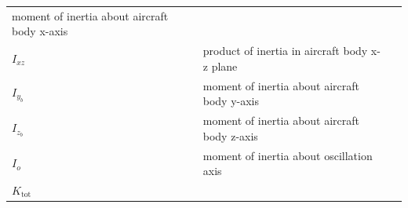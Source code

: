 \documentclass[
]{book}
\begin{document}
\begin{longtable}[]{@{}lll@{}}
\begin{minipage}[t]{0.68\columnwidth}
moment of inertia about aircraft body x-axis\strut
\end{minipage} & \begin{minipage}[t]{0.10\columnwidth}\raggedright
\strut
\end{minipage}\tabularnewline
\begin{minipage}[t]{0.14\columnwidth}\raggedright
\(I_{xz}\)\strut
\end{minipage} & \begin{minipage}[t]{0.68\columnwidth}\raggedright
product of inertia in aircraft body x-z plane\strut
\end{minipage} & \begin{minipage}[t]{0.10\columnwidth}\raggedright
\strut
\end{minipage}\tabularnewline
\begin{minipage}[t]{0.14\columnwidth}\raggedright
\(I_{y_b}\)\strut
\end{minipage} & \begin{minipage}[t]{0.68\columnwidth}\raggedright
moment of inertia about aircraft body y-axis\strut
\end{minipage} & \begin{minipage}[t]{0.10\columnwidth}\raggedright
\strut
\end{minipage}\tabularnewline
\begin{minipage}[t]{0.14\columnwidth}\raggedright
\(I_{z_b}\)\strut
\end{minipage} & \begin{minipage}[t]{0.68\columnwidth}\raggedright
moment of inertia about aircraft body z-axis\strut
\end{minipage} & \begin{minipage}[t]{0.10\columnwidth}\raggedright
\strut
\end{minipage}\tabularnewline
\begin{minipage}[t]{0.14\columnwidth}\raggedright
\(I_o\)\strut
\end{minipage} & \begin{minipage}[t]{0.68\columnwidth}\raggedright
moment of inertia about oscillation axis\strut
\end{minipage} & \begin{minipage}[t]{0.10\columnwidth}\raggedright
\strut
\end{minipage}\tabularnewline
\begin{minipage}[t]{0.14\columnwidth}\raggedright
\(K_{\mathrm{tot}}\)\strut
\end{minipage} & \begin{minipage}[t]{0.68\columnwidth}\raggedright

\end{minipage}
\end{longtable}
\end{document}
